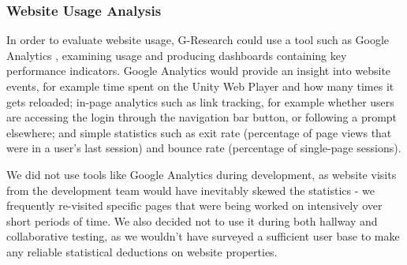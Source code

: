 \subsubsection{Website Usage Analysis}

In order to evaluate website usage, G-Research could use a tool such as Google Analytics \cite{googleanalytics}, examining usage and producing dashboards containing key performance indicators. Google Analytics would provide an insight into website events, for example time spent on the Unity Web Player and how many times it gets reloaded; in-page analytics such as link tracking, for example whether users are accessing the login through the navigation bar button, or following a prompt elsewhere; and simple statistics such as exit rate (percentage of page views that were in a user's last session) and bounce rate (percentage of single-page sessions).

We did not use tools like Google Analytics during development, as website visits from the development team would have inevitably skewed the statistics - we frequently re-visited specific pages that were being worked on intensively over short periods of time. We also decided not to use it during both hallway and collaborative testing, as we wouldn't have surveyed a sufficient user base to make any reliable statistical deductions on website properties. 


